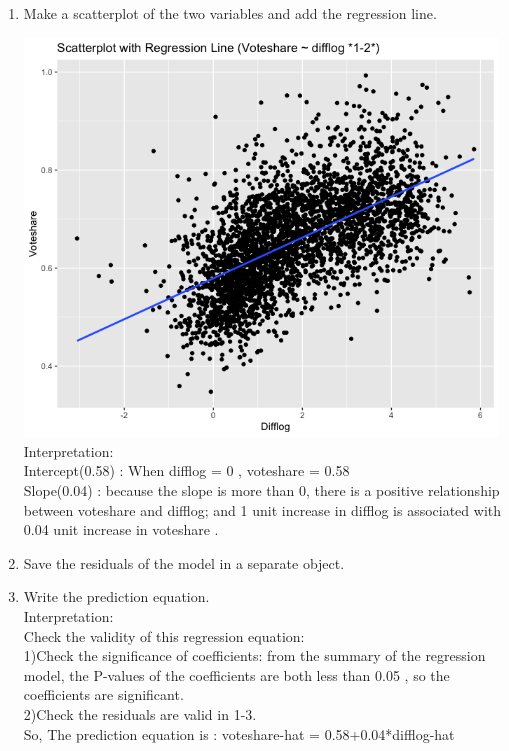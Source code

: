 \documentclass[12pt,letterpaper]{article}
\begin{document}
\begin{enumerate}
		\item Make a scatterplot of the two variables and add the regression line. 	\vspace{1cm}
		
		\includegraphics[width=0.99\textwidth]{1-2.png}
		\vspace{1cm}
		\noindent
		Interpretation:\\
		Intercept(0.58) : When difflog = 0 , voteshare = 0.58\\
		Slope(0.04) : because the slope is more than 0, there is a positive relationship between voteshare and difflog; and 1 unit increase in difflog is associated with 0.04 unit increase in voteshare .
		\item Save the residuals of the model in a separate object.	\vspace{1cm}
		 \vspace{1cm}
		\item Write the prediction equation.\\
		\noindent
		Interpretation:\\
		Check the validity of this regression equation:\\
		1)Check the significance of coefficients: from the summary of the regression model, the P-values of the coefficients are both less than 0.05 , so the coefficients are significant.\\
		2)Check the residuals are valid in 1-3.\\
		So, The prediction equation is : voteshare-hat = 0.58+0.04*difflog-hat
	\end{enumerate}
	
\end{document}
